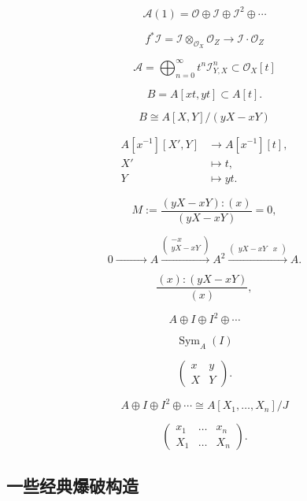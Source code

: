 \[
	\mathscr A(1)=\mathscr O\oplus \mathscr I \oplus \mathscr I^2\oplus \cdots
\]


\[
	f^*\mathscr I=\mathscr I\otimes_{\mathscr O_X}\mathscr O_Z\to \mathscr I\cdot \mathscr O_Z
\]

\[
	\mathscr A=\bigoplus_{n=0}^\infty t^n\mathscr I_{Y,X}^n\subset \mathscr O_X[t]
\]


\[
	B=A[xt,yt]\subset A[t].
\]

\[
	B\cong A[X,Y]/(yX-xY)
\]

\[
	\begin{aligned}
		A[x^{-1}][X',Y] & \longrightarrow A[x^{-1}][t],\\
		X' &\longmapsto t,\\
		Y  &\longmapsto yt.
	\end{aligned}
\]

\[
	M:=\frac{(yX-xY):(x)}{(yX-xY)}=0,
\]

\[
	0\xrightarrow{\qquad\quad\quad} A \xrightarrow{
	\begin{pmatrix}
		-x\\ yX-xY
	\end{pmatrix}}A^2
	\xrightarrow{\begin{pmatrix}
		yX-xY& x
	\end{pmatrix}}A.
\]

\[
	\frac{(x):(yX-xY)}{(x)},
\]


\[
	A\oplus I \oplus I^2\oplus \cdots
\]

\[
	\operatorname{Sym}_A(I)
\]

\[
	\begin{pmatrix}
		x&y\\
		X&Y
	\end{pmatrix}.
\]

\[
	A\oplus I \oplus I^2\oplus \cdots\cong A[X_1,\dots,X_n]/J
\]

\[
	\begin{pmatrix}
		x_1&\dots&x_n\\
		X_1&\dots&X_n
	\end{pmatrix}.
\]

\subsection{一些经典爆破构造}\label{s:4.2.2}